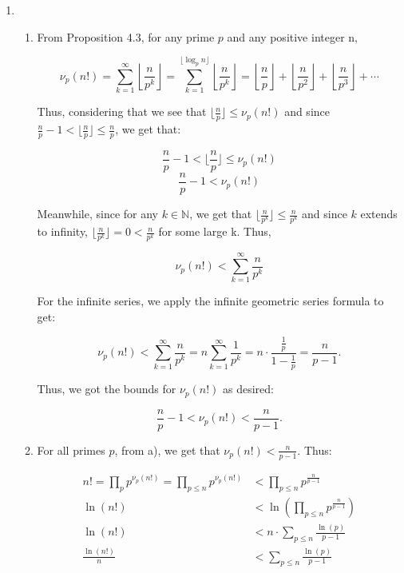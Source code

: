 \documentclass{article}
\begin{document}
\begin{enumerate}[leftmargin=*, label=\arabic*.]
\begin{enumerate}[label=\alph*)]
    \end{enumerate}
    \newpage

    
    \item
    \begin{enumerate}[label=\alph*)]
    \item
    From Proposition 4.3, for any prime $p$ and any positive integer n, 
    
    \[
    \nu_p(n!) = \sum_{k=1}^{\infty} \left\lfloor \frac{n}{p^k} \right\rfloor
    = \sum_{k=1}^{\lfloor \log_p n \rfloor} \left\lfloor \frac{n}{p^k} \right\rfloor
    = \left\lfloor \frac{n}{p} \right\rfloor
    + \left\lfloor \frac{n}{p^2} \right\rfloor
    + \left\lfloor \frac{n}{p^3} \right\rfloor + \cdots
    \]

    Thus, considering that we see that $\lfloor \frac{n}{p} \rfloor \leq \nu_p(n!)$ and since $\frac{n}{p} - 1 < \lfloor \frac{n}{p} \rfloor \leq \frac{n}{p}$, we get that: 

    $$\frac{n}{p} - 1 < \lfloor \frac{n}{p} \rfloor \leq \nu_p(n!)$$
    $$\frac{n}{p} - 1 < \nu_p(n!)$$

    Meanwhile, since for any $k \in \mathbb{N}$, we get that $\lfloor \frac{n}{p^k} \rfloor \leq \frac{n}{p^k}$ and since $k$ extends to infinity, $\lfloor \frac{n}{p^k} \rfloor = 0 < \frac{n}{p^k}$ for some large k. Thus, 

    \[
    \nu_p(n!) 
    < \sum_{k=1}^{\infty} \frac{n}{p^k}
    \]

    For the infinite series, we apply the infinite geometric series formula to get: 

    \[
    \nu_p(n!) 
    < \sum_{k=1}^{\infty} \frac{n}{p^k}
    = n \sum_{k=1}^{\infty} \frac{1}{p^k}
    = n \cdot \frac{\frac{1}{p}}{1 - \frac{1}{p}}
    = \frac{n}{p - 1}.
    \]
    
    Thus, we got the bounds for $\nu_p(n!)$ as desired: 
    
    \[
    \frac{n}{p} - 1 < \nu_p(n!) < \frac{n}{p-1}.
    \]

    \item 
    For all primes $p$, from a), we get that $\nu_p(n!) < \frac{n}{p - 1}$. Thus: 

    \begin{align*}
        n! = \prod_p p^{\nu_p(n!)} = \prod_{p \leq n} p^{\nu_p(n!)} &< \prod_{p \leq n} p^{\frac{n}{p - 1}} \\
        \ln(n!) &< \ln\!\left( \prod_{p \leq n} p^{\frac{n}{p - 1}} \right) \\
        \ln(n!) &< n \cdot \sum_{p \leq n} \frac{\ln(p)}{p - 1} \\
        \frac{\ln(n!)}{n} &< \sum_{p \leq n} \frac{\ln(p)}{p - 1}
    \end{align*}
    

\end{enumerate}
\end{enumerate}
\end{document}
